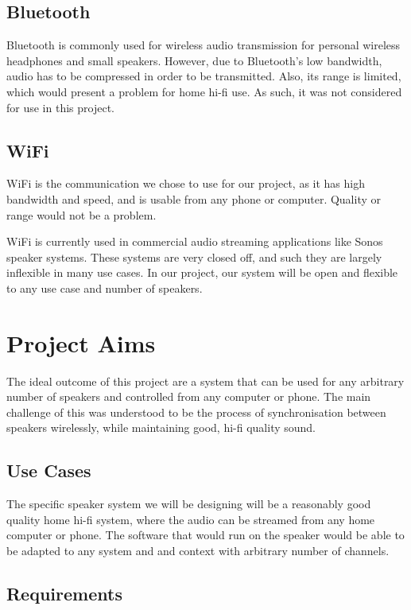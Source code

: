 \documentclass[main.tex]{subfiles}
\begin{document}
\subsection{Bluetooth}
Bluetooth is commonly used for wireless audio transmission for personal wireless headphones and small speakers.
However, due to Bluetooth's low bandwidth, audio has to be compressed in order to be transmitted.
Also, its range is limited, which would present a problem for home hi-fi use.
As such, it was not considered for use in this project.
\subsection{WiFi}
WiFi is the communication we chose to use for our project, as it has high bandwidth and speed, and is usable from any phone or computer.
Quality or range would not be a problem.

WiFi is currently used in commercial audio streaming applications like Sonos speaker systems.
These systems are very closed off, and such they are largely inflexible in many use cases.
In our project, our system will be open and flexible to any use case and number of speakers.

\section{Project Aims}
The ideal outcome of this project are a system that can be used for any arbitrary number of speakers and controlled from any computer or phone.
The main challenge of this was understood to be the process of synchronisation between speakers wirelessly, while maintaining good, hi-fi quality sound.

\subsection{Use Cases}
The specific speaker system we will be designing will be a reasonably good quality home hi-fi system, where the audio can be streamed from any home computer or phone.
The software that would run on the speaker would be able to be adapted to any system and and context with arbitrary number of channels.
\subsection{Requirements}
\end{document}
